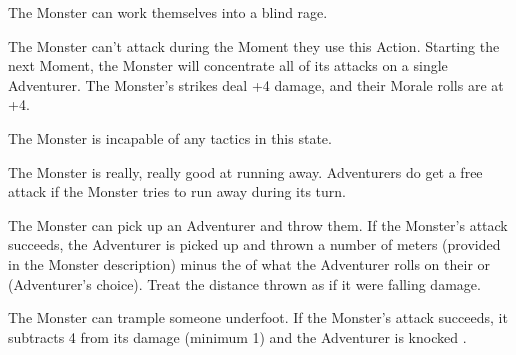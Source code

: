 
The Monster can work themselves into a blind rage.  

The Monster can't attack during the Moment they use this Action.  Starting the next Moment, the Monster will concentrate all of its attacks on a single Adventurer.  The Monster's strikes deal +4 damage, and their Morale rolls are at +4.

The Monster is incapable of any tactics in this state.

\newpage


The Monster is really, really good at running away. Adventurers do  get a free attack if the Monster tries to run away during its turn.


The Monster can pick up an Adventurer and throw them.  If the Monster's attack succeeds, the Adventurer is picked up and thrown a number of meters (provided in the Monster description) minus the \SUM of what the Adventurer rolls on their \VIG or \DEX (Adventurer's choice).  Treat the distance thrown as if it were falling damage.

\cbreak


The Monster can trample someone underfoot. If the Monster's attack succeeds, it subtracts 4 from its damage (minimum 1) and the Adventurer is knocked .




